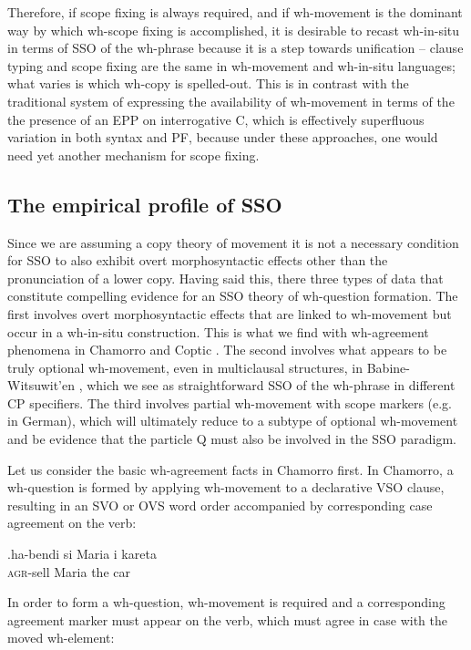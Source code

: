 \documentclass[11pt]{article}
\begin{document}
Therefore, if scope fixing is always required, and if wh-movement is the dominant way by which wh-scope fixing is accomplished, it is desirable to recast wh-in-situ in terms of SSO of the wh-phrase because it is a step towards unification -- clause typing and scope fixing are the same in wh-movement and wh-in-situ languages; what varies is which wh-copy is spelled-out. This is in contrast with the traditional system of expressing the availability of wh-movement in terms of the the presence of an EPP on interrogative C, which is effectively superfluous variation in both syntax and PF, because under these approaches, one would need yet another mechanism for scope fixing.

\subsection{The empirical profile of SSO}
Since we are assuming a copy theory of movement it is not a necessary condition for SSO to also exhibit overt morphosyntactic effects other than the pronunciation of a lower copy. Having said this, there three types of data that constitute compelling evidence for an SSO theory of wh-question formation. The first involves overt morphosyntactic effects that are linked to wh-movement but occur in a wh-in-situ construction.  This is what  we find with wh-agreement phenomena in Chamorro and Coptic \citep{rlc:2006}. The second involves what appears to be truly optional wh-movement, even in multiclausal structures, in Babine-Witsuwit'en \citep{denham:1997, denham:00}, which we see as straightforward SSO of the wh-phrase in different CP specifiers. The third involves partial wh-movement with scope markers (e.g. in German), which will ultimately reduce to a subtype of optional wh-movement and be evidence that the particle Q must also be involved in the SSO paradigm.

Let us consider the basic wh-agreement facts in Chamorro first. In Chamorro, a wh-question is formed by applying wh-movement to a declarative VSO clause, resulting in an SVO or OVS word order accompanied by corresponding case agreement on the verb:

\exg.\label{wh.110}ha-bendi si Maria i kareta\\
   \textsc{agr}-sell {} Maria the car\\

In order to form a wh-question, wh-movement is required and a corresponding agreement marker must appear on the verb, which must agree in case with the moved wh-element:
\end{document}
